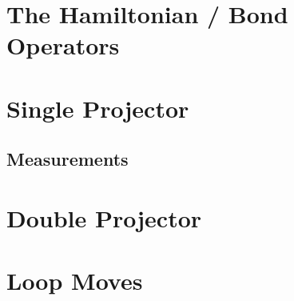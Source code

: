\section{The Hamiltonian / Bond Operators}
\section{Single Projector}
\subsection{Measurements}
\section{Double Projector}
\section{Loop Moves}
